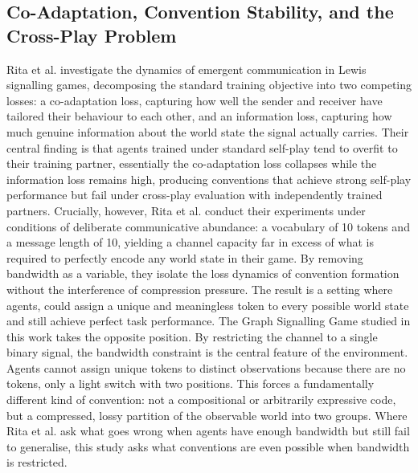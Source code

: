 \documentclass[a4paper,twoside,12pt]{report}
\begin{document}
    \subsection*{Co-Adaptation, Convention Stability, and the Cross-Play Problem}
    Rita et al. \citeyearpar{rita2022} investigate the dynamics of emergent communication in Lewis signalling games, decomposing the standard training objective into two competing losses: a co-adaptation loss, capturing how well the sender and receiver have tailored their behaviour to each other, and an information loss, capturing how much genuine information about the world state the signal actually carries. Their central finding is that agents trained under standard self-play tend to overfit to their training partner, essentially the co-adaptation loss collapses while the information loss remains high, producing conventions that achieve strong self-play performance but fail under cross-play evaluation with independently trained partners. Crucially, however, Rita et al. conduct their experiments under conditions of deliberate communicative abundance: a vocabulary of 10 tokens and a message length of 10, yielding a channel capacity far in excess of what is required to perfectly encode any world state in their game. By removing bandwidth as a variable, they isolate the loss dynamics of convention formation without the interference of compression pressure. The result is a setting where agents, could assign a unique and meaningless token to every possible world state and still achieve perfect task performance. The Graph Signalling Game studied in this work takes the opposite position. By restricting the channel to a single binary signal, the bandwidth constraint is the central feature of the environment. Agents cannot assign unique tokens to distinct observations because there are no tokens, only a light switch with two positions. This forces a fundamentally different kind of convention: not a compositional or arbitrarily expressive code, but a compressed, lossy partition of the observable world into two groups. Where Rita et al. ask what goes wrong when agents have enough bandwidth but still fail to generalise, this study asks what conventions are even possible when bandwidth is restricted. 
    \newline
    \newline
\end{document}

